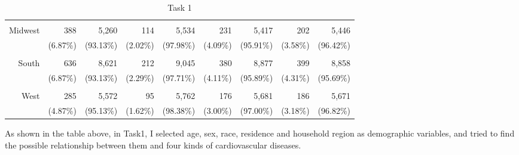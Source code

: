 \documentclass{article}
\begin{document}
\begin{table}[!h]
{\begin{tabular}{lllllllll}
			\multicolumn{1}{r}{} &
			\multicolumn{1}{r}{} &
			\multicolumn{1}{r}{} &
			\multicolumn{1}{r}{} &
			\multicolumn{1}{r}{} \\
			\multicolumn{1}{r}{Midwest\hspace{1em}} &
			\multicolumn{1}{|r}{388} &
			\multicolumn{1}{r}{5,260} &
			\multicolumn{1}{r}{114} &
			\multicolumn{1}{r}{5,534} &
			\multicolumn{1}{r}{231} &
			\multicolumn{1}{r}{5,417} &
			\multicolumn{1}{r}{202} &
			\multicolumn{1}{r}{5,446} \\
			\multicolumn{1}{r}{} &
			\multicolumn{1}{|r}{(6.87\%)} &
			\multicolumn{1}{r}{(93.13\%)} &
			\multicolumn{1}{r}{(2.02\%)} &
			\multicolumn{1}{r}{(97.98\%)} &
			\multicolumn{1}{r}{(4.09\%)} &
			\multicolumn{1}{r}{(95.91\%)} &
			\multicolumn{1}{r}{(3.58\%)} &
			\multicolumn{1}{r}{(96.42\%)} \\
			\multicolumn{1}{r}{} &
			\multicolumn{1}{|r}{} &
			\multicolumn{1}{r}{} &
			\multicolumn{1}{r}{} &
			\multicolumn{1}{r}{} &
			\multicolumn{1}{r}{} &
			\multicolumn{1}{r}{} &
			\multicolumn{1}{r}{} &
			\multicolumn{1}{r}{} \\
			\multicolumn{1}{r}{South\hspace{1em}} &
			\multicolumn{1}{|r}{636} &
			\multicolumn{1}{r}{8,621} &
			\multicolumn{1}{r}{212} &
			\multicolumn{1}{r}{9,045} &
			\multicolumn{1}{r}{380} &
			\multicolumn{1}{r}{8,877} &
			\multicolumn{1}{r}{399} &
			\multicolumn{1}{r}{8,858} \\
			\multicolumn{1}{r}{} &
			\multicolumn{1}{|r}{(6.87\%)} &
			\multicolumn{1}{r}{(93.13\%)} &
			\multicolumn{1}{r}{(2.29\%)} &
			\multicolumn{1}{r}{(97.71\%)} &
			\multicolumn{1}{r}{(4.11\%)} &
			\multicolumn{1}{r}{(95.89\%)} &
			\multicolumn{1}{r}{(4.31\%)} &
			\multicolumn{1}{r}{(95.69\%)} \\
			\multicolumn{1}{r}{} &
			\multicolumn{1}{|r}{} &
			\multicolumn{1}{r}{} &
			\multicolumn{1}{r}{} &
			\multicolumn{1}{r}{} &
			\multicolumn{1}{r}{} &
			\multicolumn{1}{r}{} &
			\multicolumn{1}{r}{} &
			\multicolumn{1}{r}{} \\
			\multicolumn{1}{r}{West\hspace{1em}} &
			\multicolumn{1}{|r}{285} &
			\multicolumn{1}{r}{5,572} &
			\multicolumn{1}{r}{95} &
			\multicolumn{1}{r}{5,762} &
			\multicolumn{1}{r}{176} &
			\multicolumn{1}{r}{5,681} &
			\multicolumn{1}{r}{186} &
			\multicolumn{1}{r}{5,671} \\
			\multicolumn{1}{r}{} &
			\multicolumn{1}{|r}{(4.87\%)} &
			\multicolumn{1}{r}{(95.13\%)} &
			\multicolumn{1}{r}{(1.62\%)} &
			\multicolumn{1}{r}{(98.38\%)} &
			\multicolumn{1}{r}{(3.00\%)} &
			\multicolumn{1}{r}{(97.00\%)} &
			\multicolumn{1}{r}{(3.18\%)} &
			\multicolumn{1}{r}{(96.82\%)} \\
			\cline{1-9}
		\end{tabular}
	}
	\caption{Task 1}
	\label{tab:t1}
\end{table}	
As shown in the table above, in Task1, I selected age, sex, race, residence and household region as demographic variables, and tried to find the possible relationship between them and four kinds of cardiovascular diseases.
\end{document}
